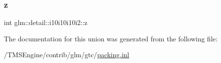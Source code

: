 \subsubsection{\texorpdfstring{z}{z}}
{\footnotesize\ttfamily int glm\+::detail\+::i10i10i10i2\+::z}



The documentation for this union was generated from the following file\+:\begin{DoxyCompactItemize}
\item 
/\+T\+M\+S\+Engine/contrib/glm/gtc/\hyperlink{packing_8inl}{packing.\+inl}\end{DoxyCompactItemize}
